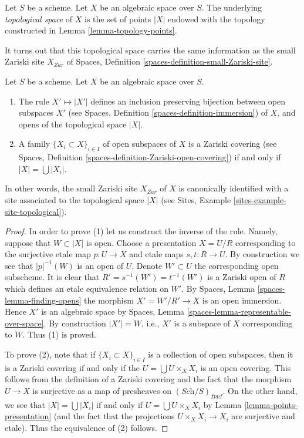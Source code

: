 \begin{definition}
\label{definition-topological-space}
Let $S$ be a scheme. Let $X$ be an algebraic space over $S$.
The underlying {\it topological space} of $X$ is the set of points
$|X|$ endowed with the topology constructed in
Lemma \ref{lemma-topology-points}.
\end{definition}

\noindent
It turns out that this topological space carries the same information
as the small Zariski site $X_{Zar}$ of
Spaces, Definition \ref{spaces-definition-small-Zariski-site}.

\begin{lemma}
\label{lemma-open-subspaces}
Let $S$ be a scheme.
Let $X$ be an algebraic space over $S$.
\begin{enumerate}
\item The rule $X' \mapsto |X'|$ defines an inclusion preserving
bijection between open subspaces $X'$ (see
Spaces, Definition \ref{spaces-definition-immersion})
of $X$, and opens of the topological space $|X|$.
\item A family $\{X_i \subset X\}_{i \in I}$ of open subspaces of $X$
is a Zariski covering (see
Spaces, Definition \ref{spaces-definition-Zariski-open-covering})
if and only if $|X| = \bigcup |X_i|$.
\end{enumerate}
In other words, the small Zariski site $X_{Zar}$ of $X$ is canonically
identified with a site associated to the topological space $|X|$ (see
Sites, Example \ref{sites-example-site-topological}).
\end{lemma}

\begin{proof}
In order to prove (1) let us construct the inverse of the rule.
Namely, suppose that $W \subset |X|$ is open. Choose a presentation
$X = U/R$ corresponding to the surjective etale map
$p : U \to X$ and etale maps $s, t : R \to U$.
By construction we see that $|p|^{-1}(W)$ is an
open of $U$. Denote $W' \subset U$ the corresponding open subscheme.
It is clear that $R' = s^{-1}(W') = t^{-1}(W')$ is a Zariski open
of $R$ which defines an etale equivalence relation on $W'$.
By Spaces, Lemma \ref{spaces-lemma-finding-opens} the morphism
$X' = W'/R' \to X$ is an open immersion. Hence $X'$ is an algebraic space
by Spaces, Lemma \ref{spaces-lemma-representable-over-space}.
By construction $|X'| = W$, i.e., $X'$ is a subspace of $X$
corresponding to $W$. Thus (1) is proved.

\medskip\noindent
To prove (2), note that if $\{X_i \subset X\}_{i \in I}$ is a collection
of open subspaces, then it is a Zariski covering if and only if the
$U = \bigcup U \times_X X_i$ is an open covering. This follows from
the definition of a Zariski covering and the fact that the morphism
$U \to X$ is surjective as a map of presheaves on $(\textit{Sch}/S)_{fppf}$.
On the other hand, we see that $|X| = \bigcup |X_i|$ if and only if
$U = \bigcup U \times_X X_i$ by Lemma \ref{lemma-points-presentation}
(and the fact that the projections $U \times_X X_i \to X_i$ are surjective
and etale). Thus the equivalence of (2) follows.
\end{proof}

